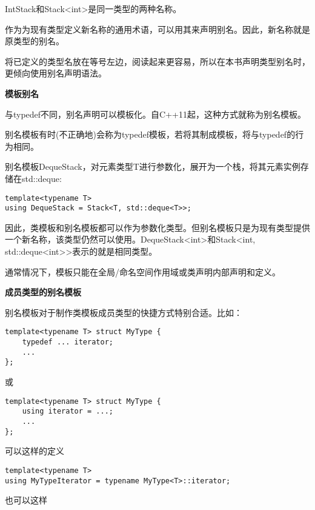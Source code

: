 IntStack和Stack<int>是同一类型的两种名称。

作为为现有类型定义新名称的通用术语，可以用其来声明别名。因此，新名称就是原类型的别名。

将已定义的类型名放在等号左边，阅读起来更容易，所以在本书声明类型别名时，更倾向使用别名声明语法。

\noindent
\textbf{模板别名}

与typedef不同，别名声明可以模板化。自C++11起，这种方式就称为别名模板。

\begin{tcolorbox}[colback=webgreen!5!white,colframe=webgreen!75!black]
\hspace*{0.75cm}别名模板有时(不正确地)会称为typedef模板，若将其制成模板，将与typedef的行为相同。
\end{tcolorbox}

别名模板DequeStack，对元素类型T进行参数化，展开为一个栈，将其元素实例存储在std::deque:

\begin{lstlisting}[style=styleCXX]
template<typename T>
using DequeStack = Stack<T, std::deque<T>>;
\end{lstlisting}

因此，类模板和别名模板都可以作为参数化类型。但别名模板只是为现有类型提供一个新名称，该类型仍然可以使用。DequeStack<int>和Stack<int, std::deque<int>>表示的就是相同类型。

通常情况下，模板只能在全局/命名空间作用域或类声明内部声明和定义。

\noindent
\textbf{成员类型的别名模板}

别名模板对于制作类模板成员类型的快捷方式特别合适。比如：

\begin{lstlisting}[style=styleCXX]
template<typename T> struct MyType {
	typedef ... iterator;
	...
};
\end{lstlisting}

或

\begin{lstlisting}[style=styleCXX]
template<typename T> struct MyType {
	using iterator = ...;
	...
};
\end{lstlisting}

可以这样的定义

\begin{lstlisting}[style=styleCXX]
template<typename T>
using MyTypeIterator = typename MyType<T>::iterator;
\end{lstlisting}

也可以这样

